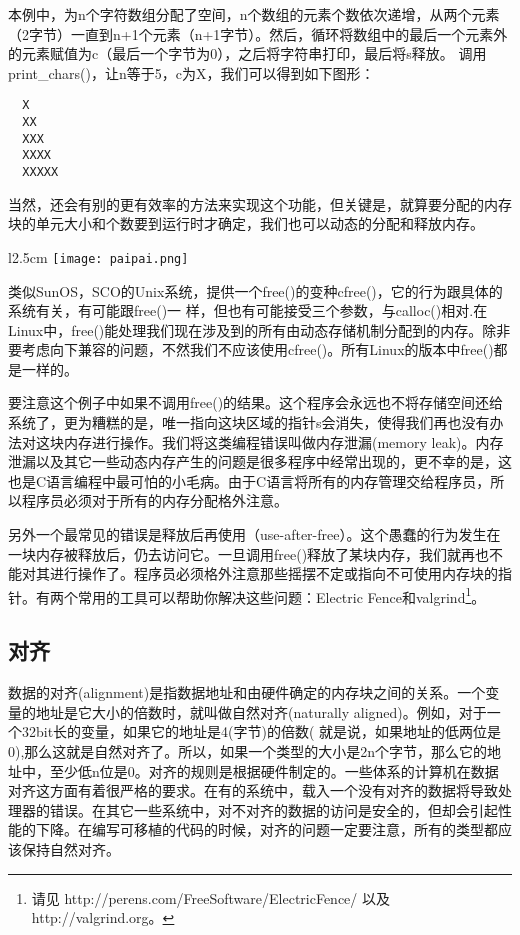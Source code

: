 本例中，为n个字符数组分配了空间，n个数组的元素个数依次递增，从两个元素（2字节）一直到n+1个元素（n+1字节）。然后，循环将数组中的最后一个元素外的元素赋值为c（最后一个字节为0），之后将字符串打印，最后将s释放。 调用print\_chars()，让n等于5，c为X，我们可以得到如下图形： 

\begin{verbatim}
  X
  XX
  XXX
  XXXX
  XXXXX
\end{verbatim}

当然，还会有别的更有效率的方法来实现这个功能，但关键是，就算要分配的内存块的单元大小和个数要到运行时才确定，我们也可以动态的分配和释放内存。

\begin{wrapfigure}{l}{2.5cm}
  \texttt{[image: paipai.png]}
\end{wrapfigure}
\mbox{}\begin{flushleft}类似SunOS，SCO的Unix系统，提供一个free()的变种cfree()，它的行为跟具体的系统有关，有可能跟free()一 样，但也有可能接受三个参数，与calloc()相对.在Linux中，free()能处理我们现在涉及到的所有由动态存储机制分配到的内存。除非要考虑向下兼容的问题，不然我们不应该使用cfree()。所有Linux的版本中free()都是一样的。\end{flushleft}

要注意这个例子中如果不调用free()的结果。这个程序会永远也不将存储空间还给系统了，更为糟糕的是，唯一指向这块区域的指针s会消失，使得我们再也没有办法对这块内存进行操作。我们将这类编程错误叫做内存泄漏(memory leak)。内存泄漏以及其它一些动态内存产生的问题是很多程序中经常出现的，更不幸的是，这也是C语言编程中最可怕的小毛病。由于C语言将所有的内存管理交给程序员，所以程序员必须对于所有的内存分配格外注意。

另外一个最常见的错误是释放后再使用（use-after-free）。这个愚蠢的行为发生在一块内存被释放后，仍去访问它。一旦调用free()释放了某块内存，我们就再也不能对其进行操作了。程序员必须格外注意那些摇摆不定或指向不可使用内存块的指针。有两个常用的工具可以帮助你解决这些问题：Electric Fence和valgrind\footnote[1]{请见 http://perens.com/FreeSoftware/ElectricFence/ 以及 http://valgrind.org。}。

\subsection{对齐}

数据的对齐(alignment)是指数据地址和由硬件确定的内存块之间的关系。一个变量的地址是它大小的倍数时，就叫做自然对齐(naturally aligned)。例如，对于一个32bit长的变量，如果它的地址是4(字节)的倍数( 就是说，如果地址的低两位是0),那么这就是自然对齐了。所以，如果一个类型的大小是2n个字节，那么它的地址中，至少低n位是0。对齐的规则是根据硬件制定的。一些体系的计算机在数据对齐这方面有着很严格的要求。在有的系统中，载入一个没有对齐的数据将导致处理器的错误。在其它一些系统中，对不对齐的数据的访问是安全的，但却会引起性能的下降。在编写可移植的代码的时候，对齐的问题一定要注意，所有的类型都应该保持自然对齐。  

